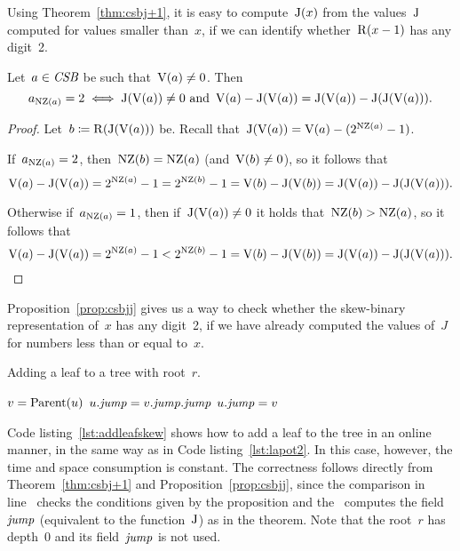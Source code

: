 \documentclass[main.tex]{subfiles}
\begin{document}
Using Theorem~\ref{thm:csbj+1}, it is easy to compute~$\operatorname{J}(x)$ from the values~$\operatorname{J}$ computed for values smaller than~$x$, if we can identify whether~$\operatorname{R}(x - 1)$ has any digit~2.

\begin{proposition} \label{prop:csbjj}
	Let~$a \in \textit{CSB}$ be such that~$\operatorname{V}(a) \neq 0$. Then \vspace{-2ex}
	$${a_{\operatorname{NZ}(a)} = 2 \iff \operatorname{J}(\operatorname{V}(a)) \neq 0 \text{ and } \operatorname{V}(a) - \operatorname{J}(\operatorname{V}(a)) = \operatorname{J}(\operatorname{V}(a)) - \operatorname{J}(\operatorname{J}(\operatorname{V}(a))).}$$
\end{proposition}
\begin{proof}
	Let~$b \coloneqq \operatorname{R}(\operatorname{J}(\operatorname{V}(a)))$ be. Recall that~${\operatorname{J}(\operatorname{V}(a)) = \operatorname{V}(a) - (2^{\operatorname{NZ}(a)} - 1)}$.

	If~${a_{\operatorname{NZ}(a)} = 2}$, then~$\operatorname{NZ}(b) = \operatorname{NZ}(a)$ (and~$\operatorname{V}(b) \neq 0$), so it follows that~$$\operatorname{V}(a) - \operatorname{J}(\operatorname{V}(a)) = 2^{\operatorname{NZ}(a)} - 1 = 2^{\operatorname{NZ}(b)} - 1 = \operatorname{V}(b) - \operatorname{J}(\operatorname{V}(b)) = \operatorname{J}(\operatorname{V}(a)) - \operatorname{J}(\operatorname{J}(\operatorname{V}(a))).$$

	Otherwise if~$a_{\operatorname{NZ}(a)} = 1$, then if~$\operatorname{J}(\operatorname{V}(a)) \neq 0$ it holds that~$\operatorname{NZ}(b) > \operatorname{NZ}(a)$, so it follows that~$$\operatorname{V}(a) - \operatorname{J}(\operatorname{V}(a)) = 2^{\operatorname{NZ}(a)} - 1 < 2^{\operatorname{NZ}(b)} - 1 = \operatorname{V}(b) - \operatorname{J}(\operatorname{V}(b)) = \operatorname{J}(\operatorname{V}(a)) - \operatorname{J}(\operatorname{J}(\operatorname{V}(a))).$$
\end{proof}

Proposition~\ref{prop:csbjj} gives us a way to check whether the skew-binary representation of~$x$ has any digit~2, if we have already computed the values of~$J$ for numbers less than or equal to~$x$.

\renewcommand{\root}{\mathit{root}}
\begin{algorithm}[h]
\caption{Adding a leaf to a tree with root~$r$.} \label{lst:addleafskew}
\begin{algorithmic}[1]
		\State $v = \operatorname{Parent}(u)$
		 \label{lst:addleafskew:if}
			\State $u.\mathit{jump} = v.\mathit{jump}.\mathit{jump}$
		\Else
			\State $u.\mathit{jump} = v$
		\EndIf
	\EndFunction
\end{algorithmic}
\end{algorithm}

Code listing~\ref{lst:addleafskew} shows how to add a leaf to the tree in an online manner, in the same way as in Code listing~\ref{lst:lapot2}. In this case, however, the time and space consumption is constant. The correctness follows directly from Theorem~\ref{thm:csbj+1} and Proposition~\ref{prop:csbjj}, since the comparison in line~ checks the conditions given by the proposition and the~ computes the field~$\mathit{jump}$ (equivalent to the function~$\operatorname{J}$) as in the theorem. Note that the root~$r$ has depth~0 and its field~$\mathit{jump}$ is not used.
\end{document}
